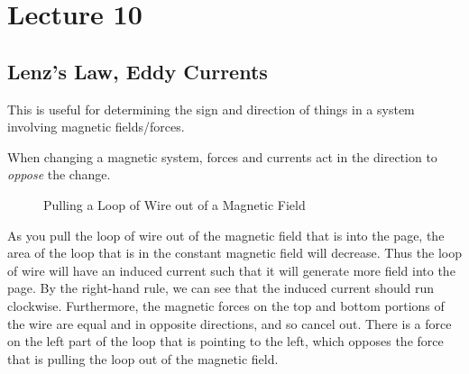 \documentclass[class=article, crop=false]{standalone}
\begin{document}
  \section{Lecture 10}
  \subsection{Lenz's Law, Eddy Currents}
  This is useful for determining the sign and direction of things in a system involving magnetic fields/forces.
  \begin{note}{}
    When changing a magnetic system, forces and currents act in the direction to \emph{oppose} the change.
  \end{note}
  \begin{figure}[ht]
    \centering
    \caption{Pulling a Loop of Wire out of a Magnetic Field}
  \end{figure}
  As you pull the loop of wire out of the magnetic field that is into the page, the area of the loop that is in the constant magnetic field will decrease. Thus the loop of wire will have an induced current such that it will generate more field into the page. By the right-hand rule, we can see that the induced current should run clockwise. Furthermore, the magnetic forces on the top and bottom portions of the wire are equal and in opposite directions, and so cancel out. There is a force on the left part of the loop that is pointing to the left, which opposes the force that is pulling the loop out of the magnetic field.
\end{document}
